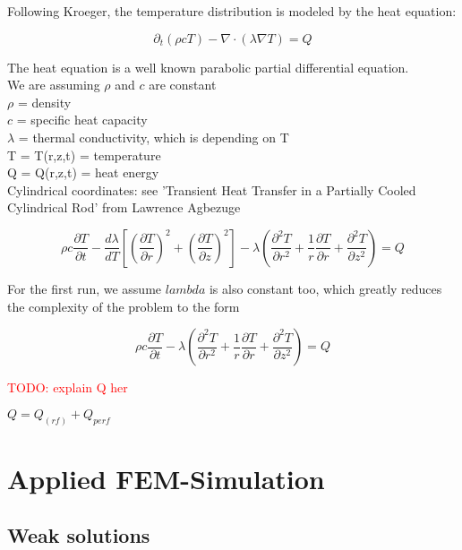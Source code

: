 \documentclass[parskip=half, titlepage=yes, 12pt, BCOR=12mm, DIV=calc]{scrartcl}
\begin{document}
Following Kroeger, the temperature distribution is modeled by the heat equation: 

\begin{equation}
    \partial_t (\rho c T) - \nabla \cdot (\lambda \nabla T) = Q
\end{equation}

The heat equation is a well known parabolic partial differential equation. \\

We are assuming $\rho$ and $c$ are constant \\
$\rho$ = density \\
$c$ = specific heat capacity \\
$\lambda$ = thermal conductivity, which is depending on T \\
T = T(r,z,t) = temperature \\
Q = Q(r,z,t) = heat energy \\


Cylindrical coordinates: see 'Transient Heat Transfer in a Partially Cooled Cylindrical Rod' from Lawrence Agbezuge

\begin{equation}
    \rho c \frac{\partial T}{\partial t} -  \frac{d\lambda}{dT} \left[ \left( \frac{\partial T}{\partial r} \right)^2 + \left( \frac{\partial T}{\partial z} \right)^2 \right] - \lambda \left( \frac{\partial^2 T}{\partial r^2} + \frac{1}{r} \frac{\partial T}{\partial r} + \frac{\partial^2 T}{\partial z^2} \right) = Q
\end{equation}

For the first run, we assume $lambda$ is also constant too, which greatly reduces the complexity of the problem to the form

\begin{equation}
    \rho c \frac{\partial T}{\partial t} - \lambda \left( \frac{\partial^2 T}{\partial r^2} + \frac{1}{r} \frac{\partial T}{\partial r} + \frac{\partial^2 T}{\partial z^2} \right) = Q
\end{equation}

\textcolor{red}{TODO: explain Q her}

$Q = Q_(rf) + Q_{perf}$

\section{Applied FEM-Simulation}
\subsection{Weak solutions}
\end{document}
